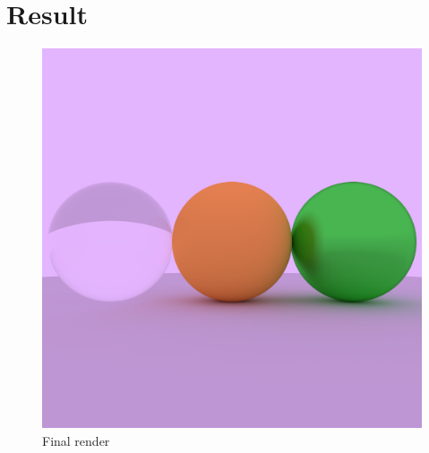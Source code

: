 \documentclass{article}
\begin{document}
\section{Result}
\begin{figure}[h]
	\centering
	\includegraphics[scale=0.99]{figures/final.png}
	\caption{Final render}
\end{figure}
\end{document}

